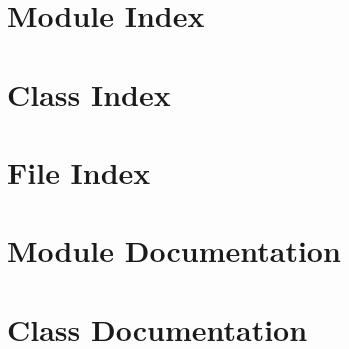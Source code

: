 \documentclass[twoside]{book}
\newcommand{\+}{\discretionary{\mbox{\scriptsize$\hookleftarrow$}}{}{}}
\begin{document}
\chapter{Module Index}

\chapter{Class Index}

\chapter{File Index}

\chapter{Module Documentation}





























\chapter{Class Documentation}

























































\end{document}
